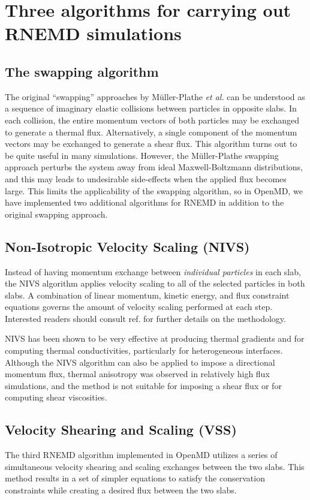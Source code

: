 \documentclass[]{book}
\begin{document}
\section{\label{section:algo}Three algorithms for carrying out RNEMD simulations}
\subsection{\label{subsection:swapping}The swapping algorithm}
The original ``swapping'' approaches by M\"{u}ller-Plathe {\it et
  al.}\cite{ISI:000080382700030,MullerPlathe:1997xw} can be understood
as a sequence of imaginary elastic collisions between particles in
opposite slabs.  In each collision, the entire momentum vectors of
both particles may be exchanged to generate a thermal
flux. Alternatively, a single component of the momentum vectors may be
exchanged to generate a shear flux.  This algorithm turns out to be
quite useful in many simulations. However, the M\"{u}ller-Plathe
swapping approach perturbs the system away from ideal
Maxwell-Boltzmann distributions, and this may leads to undesirable
side-effects when the applied flux becomes large.\cite{Maginn:2010}
This limits the applicability of the swapping algorithm, so in OpenMD,
we have implemented two additional algorithms for RNEMD in addition to the
original swapping approach.

\subsection{\label{subsection:nivs}Non-Isotropic Velocity Scaling (NIVS)}
Instead of having momentum exchange between {\it individual particles}
in each slab, the NIVS algorithm applies velocity scaling to all of
the selected particles in both slabs.\cite{kuang:164101} A combination of linear
momentum, kinetic energy, and flux constraint equations governs the
amount of velocity scaling performed at each step. Interested readers
should consult ref. \citealp{kuang:164101} for further details on the
methodology.

NIVS has been shown to be very effective at producing thermal
gradients and for computing thermal conductivities, particularly for
heterogeneous interfaces.  Although the NIVS algorithm can also be
applied to impose a directional momentum flux, thermal anisotropy was
observed in relatively high flux simulations, and the method is not
suitable for imposing a shear flux or for computing shear viscosities.

\subsection{\label{subsection:vss}Velocity Shearing and Scaling (VSS)}
The third RNEMD algorithm implemented in OpenMD utilizes a series of
simultaneous velocity shearing and scaling exchanges between the two
slabs.\cite{2012MolPh.110..691K}  This method results in a set of simpler equations to satisfy
the conservation constraints while creating a desired flux between the
two slabs.
\end{document}
